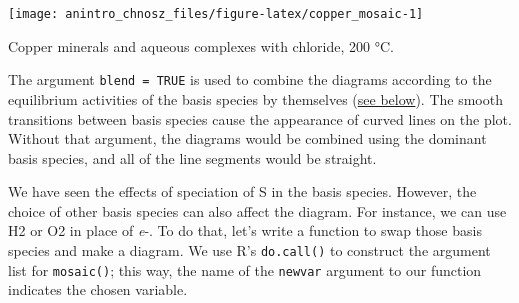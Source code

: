 \documentclass[]{tufte-book}
\newenvironment{Shaded}{}{}
\newcommand{\KeywordTok}[1]{\textcolor[rgb]{0.00,0.44,0.13}{\textbf{#1}}}
\newcommand{\DataTypeTok}[1]{\textcolor[rgb]{0.56,0.13,0.00}{#1}}
\newcommand{\DecValTok}[1]{\textcolor[rgb]{0.25,0.63,0.44}{#1}}
\newcommand{\FloatTok}[1]{\textcolor[rgb]{0.25,0.63,0.44}{#1}}
\newcommand{\StringTok}[1]{\textcolor[rgb]{0.25,0.44,0.63}{#1}}
\newcommand{\OtherTok}[1]{\textcolor[rgb]{0.00,0.44,0.13}{#1}}
\newcommand{\OperatorTok}[1]{\textcolor[rgb]{0.40,0.40,0.40}{#1}}
\newcommand{\NormalTok}[1]{#1}
\begin{document}
\begin{Shaded}
\end{Shaded}

\begin{marginfigure}
\texttt{[image: anintro\_chnosz\_files/figure-latex/copper\_mosaic-1]} \caption[Copper minerals and aqueous complexes with chloride, 200 °C]{Copper minerals and aqueous complexes with chloride, 200 °C.}\label{fig:copper_mosaic}
\end{marginfigure}

The argument \texttt{blend\ =\ TRUE} is used to combine the diagrams
according to the equilibrium activities of the basis species by
themselves (\protect\hyperlink{equilibration}{see below}). The smooth
transitions between basis species cause the appearance of curved lines
on the plot. Without that argument, the diagrams would be combined using
the dominant basis species, and all of the line segments would be
straight.

 We have seen the effects of speciation of S in the basis species.
However, the choice of other basis species can also affect the diagram.
For instance, we can use H2 or O2 in place of \emph{e}-. To do that,
let's write a function to swap those basis species and make a diagram.
We use R's \texttt{do.call()} to construct the argument list for
{\texttt{mosaic()}}; this way, the name of the \texttt{newvar} argument
to our function indicates the chosen variable.
\end{document}
